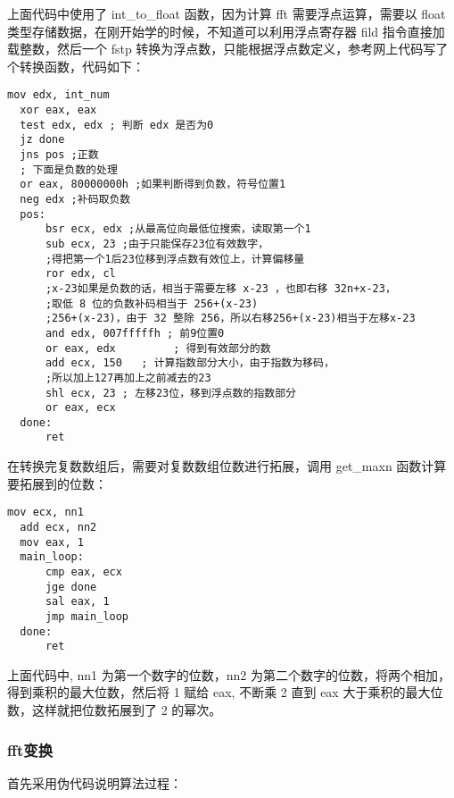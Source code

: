 \documentclass[proposal-report]{bitart}
\begin{document}
上面代码中使用了 int\_to\_float 函数，因为计算 fft 需要浮点运算，需要以 float 类型存储数据，在刚开始学的时候，不知道可以利用浮点寄存器 fild 指令直接加载整数，然后一个 fstp 转换为浮点数，只能根据浮点数定义，参考网上代码写了个转换函数，代码如下：

\begin{lstlisting}[language={[x86masm]Assembler}]
  mov edx, int_num
  xor eax, eax
  test edx, edx ; 判断 edx 是否为0
  jz done
  jns pos ;正数
  ; 下面是负数的处理
  or eax, 80000000h ;如果判断得到负数，符号位置1
  neg edx ;补码取负数
  pos:
      bsr ecx, edx ;从最高位向最低位搜索，读取第一个1
      sub ecx, 23 ;由于只能保存23位有效数字，
      ;得把第一个1后23位移到浮点数有效位上，计算偏移量
      ror edx, cl 
      ;x-23如果是负数的话，相当于需要左移 x-23 ，也即右移 32n+x-23，
      ;取低 8 位的负数补码相当于 256+(x-23)
      ;256+(x-23)，由于 32 整除 256，所以右移256+(x-23)相当于左移x-23
      and edx, 007fffffh ; 前9位置0
      or eax, edx         ; 得到有效部分的数
      add ecx, 150   ; 计算指数部分大小，由于指数为移码，
      ;所以加上127再加上之前减去的23
      shl ecx, 23 ; 左移23位，移到浮点数的指数部分
      or eax, ecx
  done:
      ret
\end{lstlisting}

在转换完复数数组后，需要对复数数组位数进行拓展，调用 get\_maxn 函数计算要拓展到的位数：

\begin{lstlisting}[language={[x86masm]Assembler}]
  mov ecx, nn1
  add ecx, nn2
  mov eax, 1
  main_loop:
      cmp eax, ecx
      jge done 
      sal eax, 1
      jmp main_loop
  done:
      ret
\end{lstlisting}

上面代码中, nn1 为第一个数字的位数，nn2 为第二个数字的位数，将两个相加，得到乘积的最大位数，然后将 1 赋给 eax, 不断乘 2 直到 eax 大于乘积的最大位数，这样就把位数拓展到了 2 的幂次。

\subsubsection{fft变换}

首先采用伪代码说明算法过程：
\end{document}
